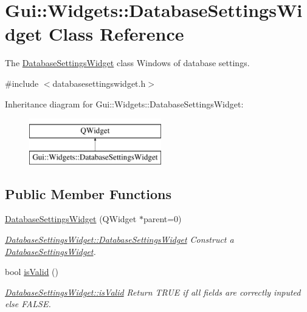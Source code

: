 \hypertarget{classGui_1_1Widgets_1_1DatabaseSettingsWidget}{\section{Gui\-:\-:Widgets\-:\-:Database\-Settings\-Widget Class Reference}
\label{classGui_1_1Widgets_1_1DatabaseSettingsWidget}
}


The \hyperlink{classGui_1_1Widgets_1_1DatabaseSettingsWidget}{Database\-Settings\-Widget} class Windows of database settings.  




{\ttfamily \#include $<$databasesettingswidget.\-h$>$}

Inheritance diagram for Gui\-:\-:Widgets\-:\-:Database\-Settings\-Widget\-:\begin{figure}[H]
\begin{center}
\leavevmode
\includegraphics[height=2.000000cm]{de/d51/classGui_1_1Widgets_1_1DatabaseSettingsWidget}
\end{center}
\end{figure}
\subsection*{Public Member Functions}
\begin{DoxyCompactItemize}
\item 
\hyperlink{classGui_1_1Widgets_1_1DatabaseSettingsWidget_a723805fcd8e71878c6d66b7296f16d85}{Database\-Settings\-Widget} (Q\-Widget $\ast$parent=0)
\begin{DoxyCompactList}\small\item\em \hyperlink{classGui_1_1Widgets_1_1DatabaseSettingsWidget_a723805fcd8e71878c6d66b7296f16d85}{Database\-Settings\-Widget\-::\-Database\-Settings\-Widget} Construct a \hyperlink{classGui_1_1Widgets_1_1DatabaseSettingsWidget}{Database\-Settings\-Widget}. \end{DoxyCompactList}\item 
bool \hyperlink{classGui_1_1Widgets_1_1DatabaseSettingsWidget_a8b7f1184a885ca63edce7957b74751c6}{is\-Valid} ()
\begin{DoxyCompactList}\small\item\em \hyperlink{classGui_1_1Widgets_1_1DatabaseSettingsWidget_a8b7f1184a885ca63edce7957b74751c6}{Database\-Settings\-Widget\-::is\-Valid} Return T\-R\-U\-E if all fields are correctly inputed else F\-A\-L\-S\-E. \end{DoxyCompactList}\end{DoxyCompactItemize}


